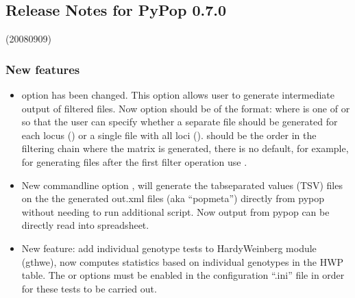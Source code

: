 \documentclass[letterpaper,10pt,english,openany,oneside]{sphinxmanual}
\begin{document}
\subsection{Release Notes for PyPop 0.7.0}
\label{\detokenize{docs/guide-chapter-changes:release-notes-for-pypop-0-7-0}}
\sphinxAtStartPar
(2008\sphinxhyphen{}09\sphinxhyphen{}09)


\subsubsection{New features}
\label{\detokenize{docs/guide-chapter-changes:id1}}\begin{itemize}
\item {} 
\sphinxAtStartPar
{} option has been changed.  This option allows user to
generate intermediate output of filtered files. Now option should
be of the format:  where  is one of
 or  so that the user can specify whether
a separate file should be generated for each locus
() or a single file with all loci ().
 should be the order in the filtering chain where the
matrix is generated, there is no default, for example, for
generating files after the first filter operation use .

\item {} 
\sphinxAtStartPar
New command\sphinxhyphen{}line option , will generate the 
tab\sphinxhyphen{}separated values (TSV) files on the the generated \sphinxhyphen{}out.xml
files (aka “popmeta”) directly from pypop without needing to run
additional script.  Now output from pypop can be directly read
into spreadsheet.

\item {} 
\sphinxAtStartPar
New feature: add individual genotype tests to Hardy\sphinxhyphen{}Weinberg module
(gthwe), now computes statistics based on individual genotypes in
the HWP table. The \sphinxcode{\sphinxupquote{{[}HardyWeinbergGuoThompson{]}}} or
\sphinxcode{\sphinxupquote{{[}HardyWeinbergGuoThompsonMonteCarlo{]}}} options must be enabled in the
configuration “.ini” file in order for these tests to be carried out.


\end{itemize}
\end{document}
